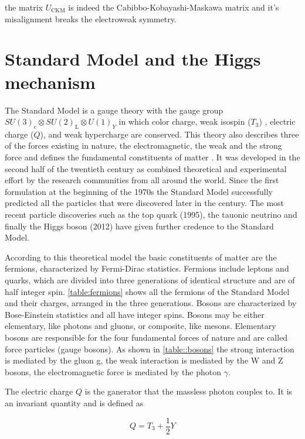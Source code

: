 the matrix $U_{\text{CKM}}$ is indeed the Cabibbo-Kobayashi-Maskawa matrix and it's misalignment breaks the electroweak symmetry.


\section{Standard Model and the Higgs mechanism}

The Standard Model is a gauge theory with the gauge group $SU(3)_\mathrm{c} \otimes SU(2)_\mathrm{L} \otimes U(1)_Y$ in which color charge, weak isospin ($T_3$) , electric charge ($Q$), and weak hypercharge are conserved. This theory also describes three of the forces existing in nature, the electromagnetic, the weak and the strong force and defines the fundamental constituents of matter \cite{Spiesberger:2000ks}. It was developed in the second half of the twentieth century as combined theoretical and experimental effort by the research communities from all around the world. Since the first formulation at the beginning of the 1970s the Standard Model successfully predicted all the particles that were discovered later in the century. The most recent particle discoveries such as the top quark \cite{Campagnari:1996ai} (1995), the tauonic neutrino \cite{Agafonova:2015jxn} and finally the Higgs boson \cite{Aad:2012tfa,Chatrchyan:2012xdj}(2012) have given further credence to the Standard Model. 

According to this theoretical model the basic constituents of matter are the fermions, characterized by Fermi-Dirac statistics. Fermions include leptons and quarks, which are divided into three generations of identical structure and are of half integer spin. \autoref{table:fermions} shows all the fermions of the Standard Model and their charges, arranged in the three generations. Bosons are characterized by Bose-Einstein statistics and all have integer spins. Bosons may be either elementary, like photons and gluons, or composite, like mesons. Elementary bosons are responsible for the four fundamental forces of nature and are called force particles (gauge bosons). As shown in \autoref{table::bosons} the strong interaction is mediated by the gluon g, the weak interaction is mediated by the W and Z bosons, the electromagnetic force is mediated by the photon $\gamma$. 

The electric charge $Q$ is the ganerator that the massless photon couples to. It is an invariant quantity and is defined as \cite{zee2003quantum}

\begin{equation}
Q = T_3 + \frac{1}{2}Y
\label{eqn:electricchargegenerator}
\end{equation}


